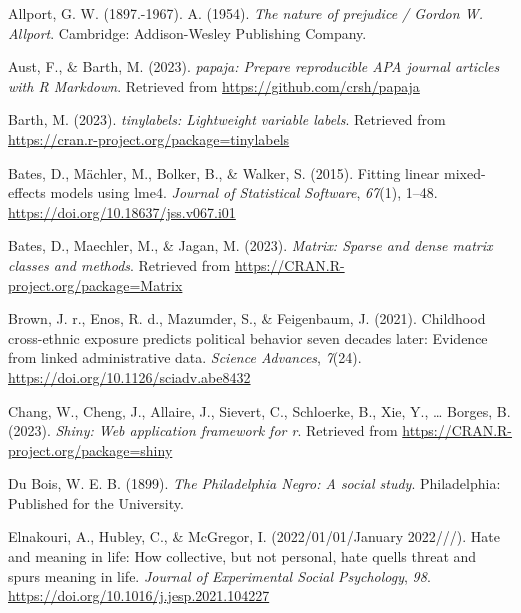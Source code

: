 \documentclass[
  man]{apa6}
\newlength{\cslhangindent}
\newlength{\cslentryspacingunit} %
\newenvironment{CSLReferences}[2] %
 {%
  \setlength{\parindent}{0pt}
  \ifodd #1
  \let\oldpar\par
  \def\par{\hangindent=\cslhangindent\oldpar}
  \fi
  \setlength{\parskip}{#2\cslentryspacingunit}
 }%
 {}
\begin{document}
\begin{CSLReferences}{1}{0}
\leavevmode{}%
Allport, G. W. (1897.-1967). A. (1954). \emph{The nature of prejudice / {Gordon W}. {Allport}}. {Cambridge}: {Addison-Wesley Publishing Company}.

\leavevmode{}%
Aust, F., \& Barth, M. (2023). \emph{{papaja}: {Prepare} reproducible {APA} journal articles with {R Markdown}}. Retrieved from \url{https://github.com/crsh/papaja}

\leavevmode{}%
Barth, M. (2023). \emph{{tinylabels}: Lightweight variable labels}. Retrieved from \url{https://cran.r-project.org/package=tinylabels}

\leavevmode{}%
Bates, D., Mächler, M., Bolker, B., \& Walker, S. (2015). Fitting linear mixed-effects models using {lme4}. \emph{Journal of Statistical Software}, \emph{67}(1), 1--48. \url{https://doi.org/10.18637/jss.v067.i01}

\leavevmode{}%
Bates, D., Maechler, M., \& Jagan, M. (2023). \emph{Matrix: Sparse and dense matrix classes and methods}. Retrieved from \url{https://CRAN.R-project.org/package=Matrix}

\leavevmode{}%
Brown, J. r., Enos, R. d., Mazumder, S., \& Feigenbaum, J. (2021). Childhood cross-ethnic exposure predicts political behavior seven decades later: {Evidence} from linked administrative data. \emph{Science Advances}, \emph{7}(24). \url{https://doi.org/10.1126/sciadv.abe8432}

\leavevmode{}%
Chang, W., Cheng, J., Allaire, J., Sievert, C., Schloerke, B., Xie, Y., \ldots{} Borges, B. (2023). \emph{Shiny: Web application framework for r}. Retrieved from \url{https://CRAN.R-project.org/package=shiny}

\leavevmode{}%
Du Bois, W. E. B. (1899). \emph{The {Philadelphia Negro}: A social study}. {Philadelphia}: {Published for the University}.

\leavevmode{}%
Elnakouri, A., Hubley, C., \& McGregor, I. (2022/01/01/January 2022///). Hate and meaning in life: {How} collective, but not personal, hate quells threat and spurs meaning in life. \emph{Journal of Experimental Social Psychology}, \emph{98}. \url{https://doi.org/10.1016/j.jesp.2021.104227}


\end{CSLReferences}
\end{document}
